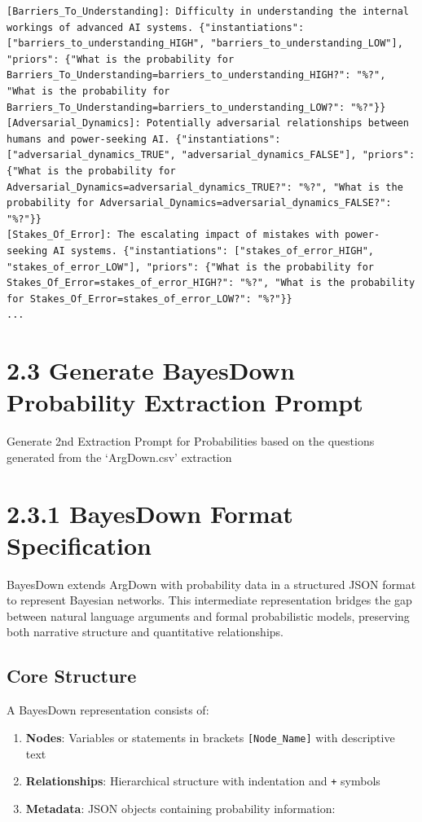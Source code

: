 \documentclass[
  11pt,
  letterpaper,
]{book}
\providecommand{\tightlist}{%
  \setlength{\itemsep}{0pt}\setlength{\parskip}{0pt}}
\begin{document}
\begin{verbatim}
[Barriers_To_Understanding]: Difficulty in understanding the internal workings of advanced AI systems. {"instantiations": ["barriers_to_understanding_HIGH", "barriers_to_understanding_LOW"], "priors": {"What is the probability for Barriers_To_Understanding=barriers_to_understanding_HIGH?": "%?", "What is the probability for Barriers_To_Understanding=barriers_to_understanding_LOW?": "%?"}}
[Adversarial_Dynamics]: Potentially adversarial relationships between humans and power-seeking AI. {"instantiations": ["adversarial_dynamics_TRUE", "adversarial_dynamics_FALSE"], "priors": {"What is the probability for Adversarial_Dynamics=adversarial_dynamics_TRUE?": "%?", "What is the probability for Adversarial_Dynamics=adversarial_dynamics_FALSE?": "%?"}}
[Stakes_Of_Error]: The escalating impact of mistakes with power-seeking AI systems. {"instantiations": ["stakes_of_error_HIGH", "stakes_of_error_LOW"], "priors": {"What is the probability for Stakes_Of_Error=stakes_of_error_HIGH?": "%?", "What is the probability for Stakes_Of_Error=stakes_of_error_LOW?": "%?"}}
...
\end{verbatim}

\section{2.3 Generate BayesDown Probability Extraction
Prompt}\label{generate-bayesdown-probability-extraction-prompt}

Generate 2nd Extraction Prompt for Probabilities based on the questions
generated from the `ArgDown.csv' extraction

\section{2.3.1 BayesDown Format
Specification}\label{bayesdown-format-specification}

BayesDown extends ArgDown with probability data in a structured JSON
format to represent Bayesian networks. This intermediate representation
bridges the gap between natural language arguments and formal
probabilistic models, preserving both narrative structure and
quantitative relationships.

\subsection{Core Structure}\label{core-structure}

A BayesDown representation consists of:

\begin{enumerate}
\def\labelenumi{\arabic{enumi}.}
\tightlist
\item
  \textbf{Nodes}: Variables or statements in brackets
  \texttt{{[}Node\_Name{]}} with descriptive text
\item
  \textbf{Relationships}: Hierarchical structure with indentation and
  \texttt{+} symbols
\item
  \textbf{Metadata}: JSON objects containing probability information:
\end{enumerate}
\end{document}
